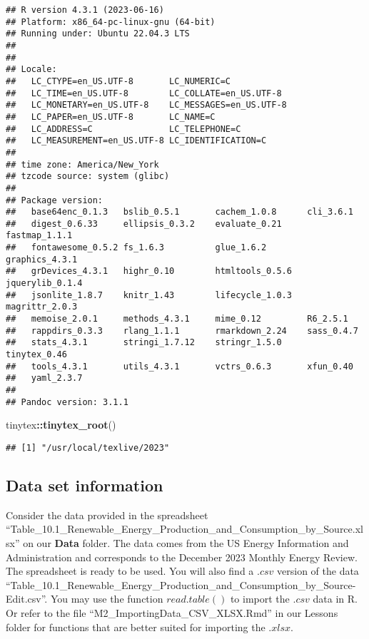 \documentclass[
]{article}
\newenvironment{Shaded}{\begin{snugshade}}{\end{snugshade}}
\newcommand{\FunctionTok}[1]{\textcolor[rgb]{0.13,0.29,0.53}{\textbf{#1}}}
\newcommand{\NormalTok}[1]{#1}
\newcommand{\SpecialCharTok}[1]{\textcolor[rgb]{0.81,0.36,0.00}{\textbf{#1}}}
\begin{document}
\begin{verbatim}
## R version 4.3.1 (2023-06-16)
## Platform: x86_64-pc-linux-gnu (64-bit)
## Running under: Ubuntu 22.04.3 LTS
## 
## 
## Locale:
##   LC_CTYPE=en_US.UTF-8       LC_NUMERIC=C              
##   LC_TIME=en_US.UTF-8        LC_COLLATE=en_US.UTF-8    
##   LC_MONETARY=en_US.UTF-8    LC_MESSAGES=en_US.UTF-8   
##   LC_PAPER=en_US.UTF-8       LC_NAME=C                 
##   LC_ADDRESS=C               LC_TELEPHONE=C            
##   LC_MEASUREMENT=en_US.UTF-8 LC_IDENTIFICATION=C       
## 
## time zone: America/New_York
## tzcode source: system (glibc)
## 
## Package version:
##   base64enc_0.1.3   bslib_0.5.1       cachem_1.0.8      cli_3.6.1        
##   digest_0.6.33     ellipsis_0.3.2    evaluate_0.21     fastmap_1.1.1    
##   fontawesome_0.5.2 fs_1.6.3          glue_1.6.2        graphics_4.3.1   
##   grDevices_4.3.1   highr_0.10        htmltools_0.5.6   jquerylib_0.1.4  
##   jsonlite_1.8.7    knitr_1.43        lifecycle_1.0.3   magrittr_2.0.3   
##   memoise_2.0.1     methods_4.3.1     mime_0.12         R6_2.5.1         
##   rappdirs_0.3.3    rlang_1.1.1       rmarkdown_2.24    sass_0.4.7       
##   stats_4.3.1       stringi_1.7.12    stringr_1.5.0     tinytex_0.46     
##   tools_4.3.1       utils_4.3.1       vctrs_0.6.3       xfun_0.40        
##   yaml_2.3.7       
## 
## Pandoc version: 3.1.1
\end{verbatim}

\begin{Shaded}
\begin{Highlighting}[]
\NormalTok{tinytex}\SpecialCharTok{::}\FunctionTok{tinytex\_root}\NormalTok{()}
\end{Highlighting}
\end{Shaded}

\begin{verbatim}
## [1] "/usr/local/texlive/2023"
\end{verbatim}

\hypertarget{data-set-information}{%
\subsection{Data set information}\label{data-set-information}}

Consider the data provided in the spreadsheet
``Table\_10.1\_Renewable\_Energy\_Production\_and\_Consumption\_by\_Source.xlsx''
on our \textbf{Data} folder. The data comes from the US Energy
Information and Administration and corresponds to the December 2023
Monthly Energy Review. The spreadsheet is ready to be used. You will
also find a \(.csv\) version of the data
``Table\_10.1\_Renewable\_Energy\_Production\_and\_Consumption\_by\_Source-Edit.csv''.
You may use the function \(read.table()\) to import the \(.csv\) data in
R. Or refer to the file ``M2\_ImportingData\_CSV\_XLSX.Rmd'' in our
Lessons folder for functions that are better suited for importing the
\(.xlsx\).
\end{document}
